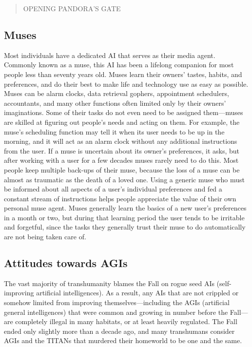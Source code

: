 \begin{quotation} 
  OPENING PANDORA'S GATE
\end{quotation}

\subsection{Muses}
\label{sec:muses}

Most individuals have a dedicated AI that serves as their media
agent. Commonly known as a muse, this AI has been a lifelong companion
for most people less than seventy years old. Muses learn their owners'
tastes, habits, and preferences, and do their best to make life and
technology use as easy as possible.  Muses can be alarm clocks, data
retrieval gophers, appointment schedulers, accountants, and many other
functions often limited only by their owners' imaginations. Some of
their tasks do not even need to be assigned them—muses are skilled at
figuring out people's needs and acting on them. For example, the
muse's scheduling function may tell it when its user needs to be up in
the morning, and it will act as an alarm clock without any additional
instructions from the user. If a muse is uncertain about its owner's
preferences, it asks, but after working with a user for a few decades
muses rarely need to do this. Most people keep multiple back-ups of
their muse, because the loss of a muse can be almost as traumatic as
the death of a loved one.  Using a generic muse who must be informed
about all aspects of a user's individual preferences and fed a
constant stream of instructions helps people appreciate the value of
their own personal muse agent. Muses generally learn the basics of a
new user's preferences in a month or two, but during that learning
period the user tends to be irritable and forgetful, since the tasks
they generally trust their muse to do automatically are not being
taken care of.

\subsection{Attitudes towards AGIs}
\label{sec:attit-toward-agis}

The vast majority of transhumanity blames the Fall on rogue seed AIs
(self-improving artificial intelligences).  As a result, any AIs that
are not crippled or somehow limited from improving
themselves—including the AGIs (artificial general intelligences) that
were common and growing in number before the Fall—are completely
illegal in many habitats, or at least heavily regulated. The Fall
ended only slightly more than a decade ago, and many transhumans
consider AGIs and the TITANs that murdered their homeworld to be one
and the same.

